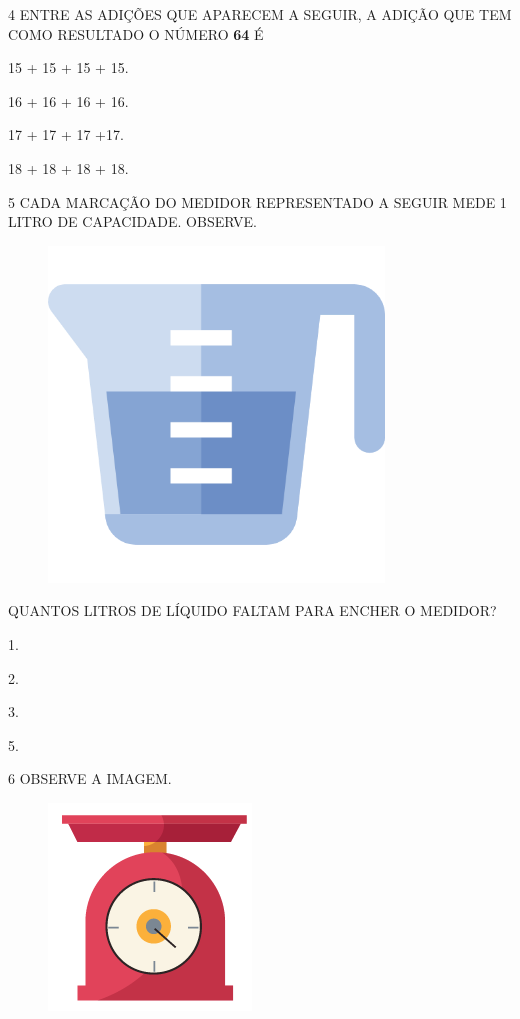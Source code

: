 \num{4} ENTRE AS ADIÇÕES QUE APARECEM A SEGUIR, A ADIÇÃO QUE 
TEM COMO RESULTADO O NÚMERO \textbf{64} É

\begin{escolha}[itemsep=0pt]
\item 15 + 15 + 15 + 15.

\item 16 + 16 + 16 + 16.

\item 17 + 17 + 17 +17.

\item 18 + 18 + 18 + 18.
\end{escolha}

\pagebreak
\num{5} CADA MARCAÇÃO DO MEDIDOR REPRESENTADO A SEGUIR MEDE 1 LITRO DE CAPACIDADE. OBSERVE.


\begin{figure}[H]
\centering
\includegraphics[width=.2\textwidth]{media/image113.png}
\end{figure}

QUANTOS LITROS DE LÍQUIDO FALTAM PARA ENCHER O MEDIDOR?

\begin{escolha}[itemsep=0pt]
\item 1.

\item 2.

\item 3.

\item 5.
\end{escolha}

\num{6} OBSERVE A IMAGEM.


\begin{figure}[H]
\centering
\includegraphics[width=.25\textwidth]{./media/SAEB_1ANO_MAT_FIGURA123.png}
\end{figure}

